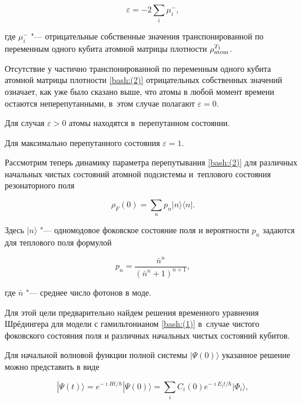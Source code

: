 \begin{equation}

\varepsilon =-2\sum _{i}\mu _{i}^{-}, \label{bash:(2)}

\end{equation}

где $\mu _{i}^{-} $ "--- отрицательные собственные значения транспонированной по переменным одного кубита атомной матрицы плотности $\rho _{\rm atom}^{T_{1} } $.

Отсутствие у частично транспонированной по переменным одного кубита атомной матрицы плотности \eqref{bash:(2)} отрицательных собственных значений означает, как уже было сказано выше, что атомы в любой момент времени остаются неперепутанными, в~этом случае полагают  $\varepsilon =0$.  

Для случая $\varepsilon >0$ атомы находятся в~перепутанном состоянии. 

Для максимально перепутанного состояния  $\varepsilon =1$.



Рассмотрим теперь динамику параметра перепутывания \eqref{bash:(2)} для различных начальных чистых  состояний атомной подсистемы и~теплового состояния резонаторного поля

\begin{equation}

\rho_F(0) =\sum\limits_n p_n |n\rangle \langle n|. \label{bash:(3)}

\end{equation}

Здесь  $|n\rangle$ "--- одномодовое фоковское состояние поля и вероятности $p_n$ задаются для теплового поля формулой

$$

p_n= \frac{\bar{n}^n}{\left(\bar{n}^n+1\right)^{n+1}},

$$

где $ \bar{n} $ "--- среднее число фотонов в моде. 

Для этой цели предварительно найдем решения временного уравнения Шрёдингера для модели с гамильтонианом \eqref{bash:(1)} в~случае чистого фоковского состояния поля и различных начальных чистых состояний кубитов. 

Для начальной волновой функции полной системы $|\Psi(0)\rangle$ указанное решение можно представить в виде

\begin{equation}

|\Psi(t)\rangle = e^{-\imath H t/\hbar}|\Psi(0)\rangle = \sum\limits_{i} C_i(0) e^{-\imath E_{i} t/\hbar} |\Phi_i\rangle,\label{bash:(4)}

\end{equation}


